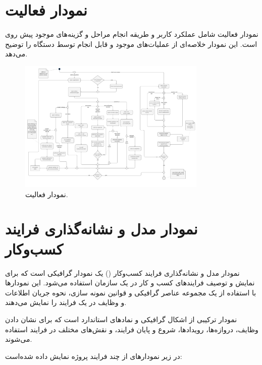 \section{
    نمودار فعالیت
}\label{sec4:chap2}
نمودار فعالیت شامل عملکرد کاربر و طریقه انجام مراحل و گزینه‌های موجود پیش روی است.
این نمودار خلاصه‌ای از عملیات‌های موجود و قابل انجام توسط دستگاه را توضیح می‌دهد.

\begin{figure}[!h]
    \begin{center}
        \includegraphics[width=0.8\textwidth]{../diagrams/activity-diagram.pdf}
    \end{center}
    \caption{
    نمودار فعالیت.
    }
    \label{fig4:sec1:chap1}
\end{figure}

\pagebreak
\section{
    نمودار مدل و نشانه‌گذاری فرایند کسب‌وکار
}\label{sec5:chap2}

نمودار مدل و نشانه‌گذاری فرایند کسب‌وکار
()
 یک نمودار گرافیکی است که برای نمایش و توصیف فرایندهای کسب و کار در یک سازمان استفاده می‌شود. این نمودارها با استفاده از یک مجموعه عناصر گرافیکی و قوانین نمونه سازی، نحوه جریان اطلاعات و وظایف در یک فرایند را نمایش می‌دهند.

نمودار
ترکیبی از اشکال گرافیکی و نمادهای استاندارد است که برای نشان دادن وظایف، دروازه‌ها، رویدادها، شروع و پایان فرایند، و نقش‌های مختلف در فرایند استفاده می‌شوند.

در زیر نمودار‌های از چند فرایند پروژه نمایش داده شده‌است:

